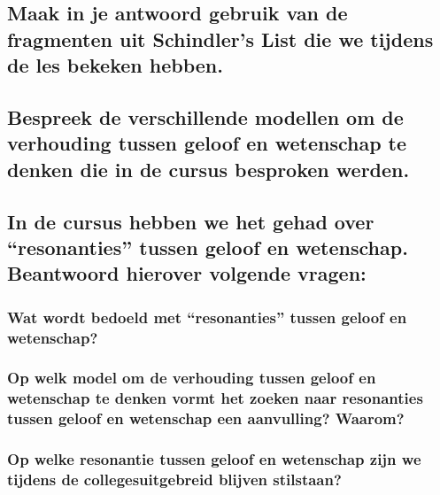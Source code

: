 \documentclass[main.tex]{subfiles}
\begin{document}
\subsection{Maak in je antwoord gebruik van de fragmenten uit Schindler’s List die we tijdens de les bekeken hebben.}
\subsection{Bespreek de verschillende modellen om de verhouding tussen geloof en wetenschap te denken die in de cursus besproken werden.}
\subsection{In de cursus hebben we het gehad over “resonanties” tussen geloof en wetenschap. Beantwoord hierover volgende vragen:}
\subsubsection*{Wat wordt bedoeld met “resonanties” tussen geloof en wetenschap?}
\subsubsection*{Op welk model om de verhouding tussen geloof en wetenschap te denken vormt het zoeken naar resonanties tussen geloof en wetenschap een aanvulling? Waarom?}
\subsubsection*{Op welke resonantie tussen geloof en wetenschap zijn we tijdens de collegesuitgebreid blijven stilstaan?}
\end{document}
